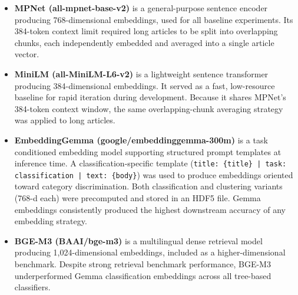 \documentclass[11pt]{article}
\begin{document}
\begin{itemize}
    \item \textbf{MPNet (all-mpnet-base-v2)} \cite{all-mpnet-base-v2} is a general-purpose sentence encoder producing 768-dimensional embeddings, used for all baseline experiments. Its 384-token context limit required long articles to be split into overlapping chunks, each independently embedded and averaged into a single article vector.
    \item \textbf{MiniLM (all-MiniLM-L6-v2)} \cite{all-MiniLM-L6-v2} is a lightweight sentence transformer producing 384-dimensional embeddings. It served as a fast, low-resource baseline for rapid iteration during development. Because it shares MPNet's 384-token context window, the same overlapping-chunk averaging strategy was applied to long articles.
    \item \textbf{EmbeddingGemma (google/embeddinggemma-300m)} \cite{vera2025embeddinggemma} is a task conditioned embedding model supporting structured prompt templates at inference time. A classification-specific template (\texttt{title: \{title\} | task: classification | text: \{body\}}) was used to produce embeddings oriented toward category discrimination. Both classification and clustering variants (768-d each) were precomputed and stored in an HDF5 file. Gemma embeddings consistently produced the highest downstream accuracy of any embedding strategy.
    \item \textbf{BGE-M3 (BAAI/bge-m3)} \cite{2025m3embedding} is a multilingual dense retrieval model producing 1{,}024-dimensional embeddings, included as a higher-dimensional benchmark. Despite strong retrieval benchmark performance, BGE-M3 underperformed Gemma classification embeddings across all tree-based classifiers.
\end{itemize}
 
\end{document}
